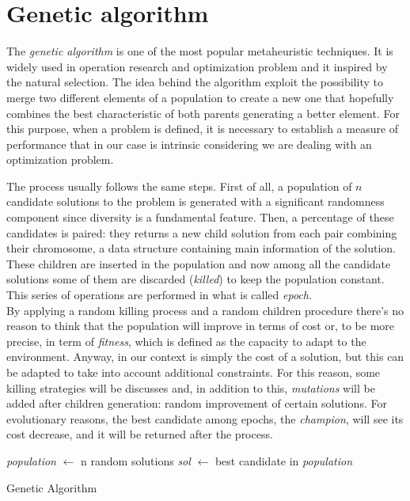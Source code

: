 \section{Genetic algorithm}
The \emph{genetic algorithm} is one of the most popular metaheuristic
techniques. It is widely used in operation research and optimization problem
and it inspired by the natural selection. The idea behind the algorithm exploit
the possibility to merge two different elements of a population to create a new
one that hopefully combines the best characteristic of both parents generating
a better element. For this purpose, when a problem is defined, it is necessary
to establish a measure of performance that in our case is intrinsic considering
we are dealing with an optimization problem. 

The process usually follows the same steps. First of all, a population of $n$
candidate solutions to the problem is generated with a significant randomness
component since diversity is a fundamental feature. Then, a percentage of these
candidates is paired: they returns a new child solution from each pair combining
their chromosome, a data structure containing main information of the solution.
These children are inserted in the population and now among all the candidate
solutions some of them are discarded (\emph{killed}) to keep the population
constant. This series of operations are performed in what is called
\emph{epoch}.\\
By applying a random killing process and a random children procedure there's no
reason to think that the population will improve in terms of cost or, to be
more precise, in term of \emph{fitness}, which is defined as the capacity to
adapt to the environment. Anyway, in our context is simply the cost of a
solution, but this can be adapted to take into account additional constraints.
For this reason, some killing strategies will be discusses and, in addition to
this, \emph{mutations} will be added after children generation: random
improvement of certain solutions. For evolutionary reasons, the best candidate
among epochs, the \emph{champion}, will see its cost decrease, and it will be
returned after the process.

\begin{algorithm}[H]
\SetAlgoLined
{}
    \emph{population} $\leftarrow$ n random solutions\;
    \emph{sol} $\leftarrow$ best candidate in \emph{population}
    \caption{Genetic Algorithm}
\end{algorithm}


